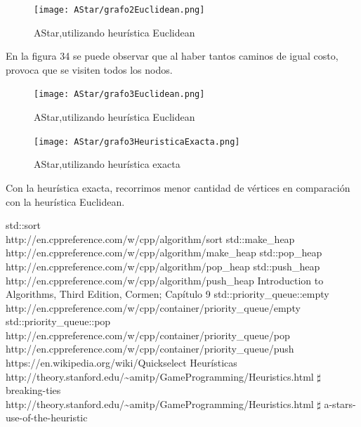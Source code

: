 \begin{figure}[H]
\centering
\texttt{[image: AStar/grafo2Euclidean.png]}
\caption{AStar,utilizando heurística Euclidean}
\end{figure}

En la figura 34 se puede observar que al haber tantos caminos de igual costo, provoca que se visiten todos los nodos.


\begin{figure}[H]
\centering
\texttt{[image: AStar/grafo3Euclidean.png]}
\caption{AStar,utilizando heurística Euclidean}
\end{figure}

\begin{figure}[H]
\centering
\texttt{[image: AStar/grafo3HeuristicaExacta.png]}
\caption{AStar,utilizando heurística exacta}
\end{figure}

Con la heurística exacta, recorrimos menor cantidad de vértices en comparación con la heurística Euclidean.

\newpage

\renewcommand\refname{Referencias}
\begin{thebibliography}{X}
 std::sort\\ http://en.cppreference.com/w/cpp/algorithm/sort
 std::make\_heap\\http://en.cppreference.com/w/cpp/algorithm/make\_heap
 std::pop\_heap\\ http://en.cppreference.com/w/cpp/algorithm/pop\_heap
 std::push\_heap\\http://en.cppreference.com/w/cpp/algorithm/push\_heap
 Introduction to Algorithms, Third Edition, Cormen; Capítulo 9
 std::priority\_queue::empty\\
http://en.cppreference.com/w/cpp/container/priority\_queue/empty
 std::priority\_queue::pop\\ http://en.cppreference.com/w/cpp/container/priority\_queue/pop
 \\ http://en.cppreference.com/w/cpp/container/priority\_queue/push 
 \\ https://en.wikipedia.org/wiki/Quickselect
 Heurísticas \\
http://theory.stanford.edu/\textasciitilde amitp/GameProgramming/Heuristics.html $\sharp$ breaking-ties\\
http://theory.stanford.edu/\textasciitilde amitp/GameProgramming/Heuristics.html $\sharp$ a-stars-use-of-the-heuristic
\end{thebibliography}
\newpage

